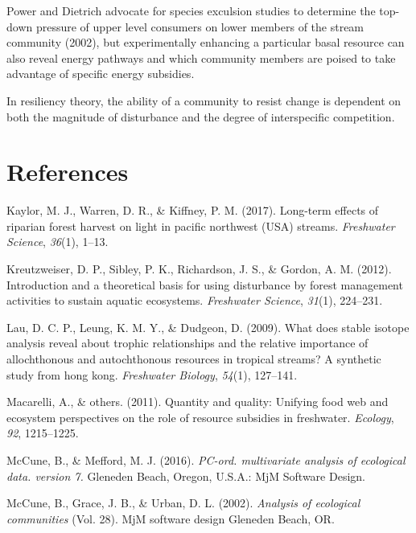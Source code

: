 \documentclass[double,12pt]{beavtex}
\begin{document}
  Power and Dietrich advocate for species exculsion studies to determine
  the top-down pressure of upper level consumers on lower members of the
  stream community (2002), but experimentally enhancing a particular basal
  resource can also reveal energy pathways and which community members are
  poised to take advantage of specific energy subsidies.
  
  In resiliency theory, the ability of a community to resist change is
  dependent on both the magnitude of disturbance and the degree of
  interspecific competition.
  
  \pagebreak
  
  \chapter*{References}\label{references}
  
  \hypertarget{refs}{}
  \hypertarget{ref-Kaylor2017FS}{}
  Kaylor, M. J., Warren, D. R., \& Kiffney, P. M. (2017). Long-term
  effects of riparian forest harvest on light in pacific northwest (USA)
  streams. \emph{Freshwater Science}, \emph{36}(1), 1--13.
  
  \hypertarget{ref-Kreutzweiser2012}{}
  Kreutzweiser, D. P., Sibley, P. K., Richardson, J. S., \& Gordon, A. M.
  (2012). Introduction and a theoretical basis for using disturbance by
  forest management activities to sustain aquatic ecosystems.
  \emph{Freshwater Science}, \emph{31}(1), 224--231.
  
  \hypertarget{ref-Lau2009}{}
  Lau, D. C. P., Leung, K. M. Y., \& Dudgeon, D. (2009). What does stable
  isotope analysis reveal about trophic relationships and the relative
  importance of allochthonous and autochthonous resources in tropical
  streams? A synthetic study from hong kong. \emph{Freshwater Biology},
  \emph{54}(1), 127--141.
  
  \hypertarget{ref-Macarelli2011}{}
  Macarelli, A., \& others. (2011). Quantity and quality: Unifying food
  web and ecosystem perspectives on the role of resource subsidies in
  freshwater. \emph{Ecology}, \emph{92}, 1215--1225.
  
  \hypertarget{ref-PC-ORD}{}
  McCune, B., \& Mefford, M. J. (2016). \emph{PC-ord. multivariate
  analysis of ecological data. version 7.} Gleneden Beach, Oregon, U.S.A.:
  MjM Software Design.
  
  \hypertarget{ref-McCune2002}{}
  McCune, B., Grace, J. B., \& Urban, D. L. (2002). \emph{Analysis of
  ecological communities} (Vol. 28). MjM software design Gleneden Beach,
  OR.
  
\end{document}
